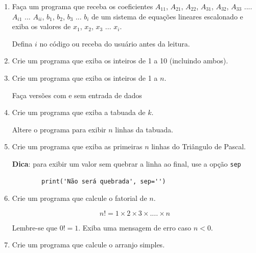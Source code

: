 \begin{enumerate}
	Caso a equação quadrática não tiver solução real ($\Delta < 0$), exiba uma mensagem de erro. 

	Também exiba informações de erro se a equação linear não tiver solução única ($b = c = 0$) ou se não tiver solução ($b = 0$ e $c \ne 0$).

	\item Faça um programa que receba os coeficientes $A_{11}$, $A_{21}$, $A_{22}$, $A_{31}$, $A_{32}$, $A_{33}$ .... $A_{i1}$ ... $A_{ii}$, $b_1$, $b_2$, $b_3$ ... $b_i$ de um sistema de equações lineares escalonado e exiba os valores de $x_1$, $x_2$, $x_3$ ... $x_i$.		

	Defina $i$ no código ou receba do usuário antes da leitura.	 

\quebra

	\item Crie um programa que exiba os inteiros de 1 a 10 (incluindo ambos). 

	\item Crie um programa que exiba os inteiros de 1 a $n$.

	Faça versões com e sem entrada de dados

	\item Crie um programa que exiba a tabuada de $k$.

	Altere o programa para exibir $n$ linhas da tabuada.  

	\item Crie um programa que exiba as primeiras $n$ linhas do Triângulo de Pascal. 
	
	\textbf{Dica}:
	para exibir um valor sem quebrar a linha ao final, use a opção \texttt{sep}
	
	\begin{verbatim}
		print('Não será quebrada', sep='')
	\end{verbatim}

	\item Crie um programa que calcule o fatorial de $n$.
	
	\begin{equation*}
		n! = 1 \times 2 \times 3 \times .... \times n
	\end{equation*}	
	
	Lembre-se que $0! = 1$.
	Exiba uma mensagem de erro caso $n < 0$.
	

	\item Crie um programa que calcule o arranjo simples.
	

\end{enumerate}
